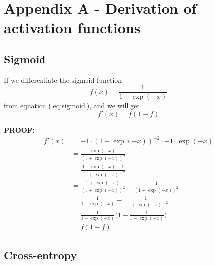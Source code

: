 \section{Appendix A - Derivation of activation functions} \label{sec:appendixa}

\subsection{Sigmoid} \label{sec:sigmoid_der}
If we differentiate the sigmoid function 
\begin{equation}
f(x)=\frac{1}{1+\exp(-x)}
\end{equation}
from equation (\ref{eq:sigmoid}), and we will get
\begin{equation}
f'(x)=f(1-f)
\end{equation}

\textbf{PROOF:}
\begin{align*}
f'(x) &= -1\cdot(1+\exp(-x))^{-2}\cdot -1\cdot\exp(-x)\\
&=\frac{\exp(-x)}{(1+\exp(-x))^{2}}\\
&=\frac{1+\exp(-x)-1}{(1+\exp(-x))^{2}}\\
&=\frac{1+\exp(-x)}{(1+\exp(-x))^{2}} - \frac{1}{(1+\exp(-x))^{2}}\\
&=\frac{1}{1+\exp(-x)} - \frac{1}{(1+\exp(-x))^{2}}\\
&=\frac{1}{1+\exp(-x)}\bigg(1 - \frac{1}{1+\exp(-x)}\bigg)\\
&=f(1-f)
\end{align*}

\subsection{Cross-entropy}